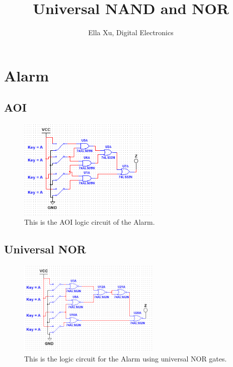 \documentclass{article}
\begin{document}
\title{Universal NAND and NOR}
\author{Ella Xu, Digital Electronics}
\maketitle

\section{Alarm}

\subsection{AOI}

\begin{figure}[!htb]
\centering
\includegraphics[width=0.6\textwidth]{images/AlarmAOI.PNG}
\caption{\label{fig:alarm aoi}This is the AOI logic circuit of the Alarm.}
\end{figure}

\subsection{Universal NOR}

\begin{figure}[!htb]
\centering
\includegraphics[width=0.6\textwidth]{images/AlarmUniversalNOR.PNG}
\caption{\label{fig:alarm nor}This is the logic circuit for the Alarm using universal NOR gates.}
\end{figure}
\end{document}
